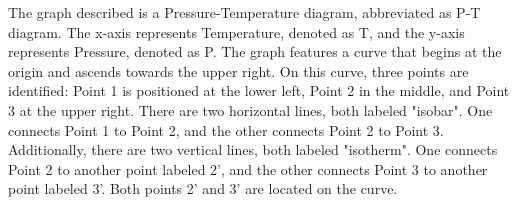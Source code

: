 The graph described is a Pressure-Temperature diagram, abbreviated as P-T diagram. The x-axis represents Temperature, denoted as T, and the y-axis represents Pressure, denoted as P. The graph features a curve that begins at the origin and ascends towards the upper right. On this curve, three points are identified: Point 1 is positioned at the lower left, Point 2 in the middle, and Point 3 at the upper right. There are two horizontal lines, both labeled "isobar". One connects Point 1 to Point 2, and the other connects Point 2 to Point 3. Additionally, there are two vertical lines, both labeled "isotherm". One connects Point 2 to another point labeled 2', and the other connects Point 3 to another point labeled 3'. Both points 2' and 3' are located on the curve.